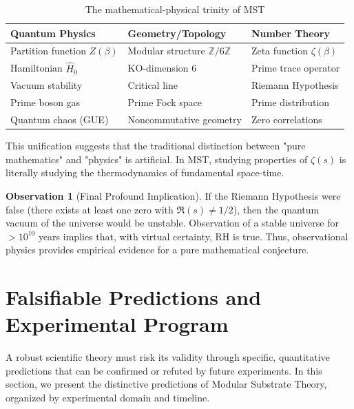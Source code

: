 \documentclass[11pt, a4paper]{article}
\theoremstyle{plain}
\theoremstyle{definition}
\newtheorem{observation}[theorem]{Observation}
\newcommand{\Zmod}{\mathbb{Z}/6\mathbb{Z}}
\begin{document}
\begin{table}[H]
\centering
\caption{The mathematical-physical trinity of MST}
\label{tab:trinity}
\begin{tabular}{lll}
\toprule
\textbf{Quantum Physics} & \textbf{Geometry/Topology} & \textbf{Number Theory} \\
\midrule
Partition function $Z(\beta)$ & Modular structure $\Zmod$ & Zeta function $\zeta(\beta)$ \\
Hamiltonian $\hat{H}_0$ & KO-dimension 6 & Prime trace operator \\
Vacuum stability & Critical line & Riemann Hypothesis \\
Prime boson gas & Prime Fock space & Prime distribution \\
Quantum chaos (GUE) & Noncommutative geometry & Zero correlations \\
\bottomrule
\end{tabular}
\end{table}

This unification suggests that the traditional distinction between "pure mathematics" and "physics" is artificial. In MST, studying properties of $\zeta(s)$ is literally studying the thermodynamics of fundamental space-time.

\begin{observation}[Final Profound Implication]
If the Riemann Hypothesis were false (there exists at least one zero with $\Re(s) \neq 1/2$), then the quantum vacuum of the universe would be unstable. Observation of a stable universe for $>10^{10}$ years implies that, with virtual certainty, RH is true. Thus, observational physics provides empirical evidence for a pure mathematical conjecture.
\end{observation}


\section{Falsifiable Predictions and Experimental Program}
\label{sec:predictions}

A robust scientific theory must risk its validity through specific, quantitative predictions that can be confirmed or refuted by future experiments. In this section, we present the distinctive predictions of Modular Substrate Theory, organized by experimental domain and timeline.
\end{document}
